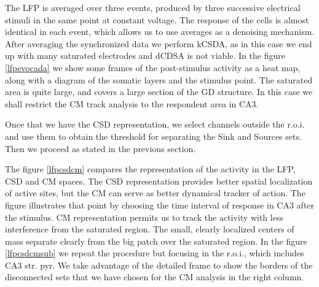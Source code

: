 \documentclass[12pt]{article}
\begin{document}



The LFP is averaged over three events, produced by three successive
electrical stimuli in the same point at constant voltage. The
response of the cells is almost identical in each event, which
allows us to use averages as a denoising mechanism. After averaging
the synchronized data we perform kCSDA, as in this case we end up
with many saturated electrodes and dCDSA is not viable.
In the figure \ref{lfpevocada} we show some frames of the post-stimulus
activity as a heat map, along
with a diagram of the somatic layers and the
stimulus point. The saturated area is quite large, and covers
a large section of the GD structure. In this case we shall
restrict the CM track analysis to the respondent area in CA3.

Once that we have the CSD representation, we select channels outside
the r.o.i. and use them to obtain the threshold for separating
the Sink and Sources sets. Then we proceed as stated in the previous section.

The figure \ref{lfpcsdcm}  compares the representation of the activity in
the LFP, CSD and CM spaces. The CSD
representation provides better spatial localization of active sites, but the
CM can serve as better dynamical tracker of action. The figure illustrates
that point by choosing the time interval of response in CA3 after the stimulus.
CM representation permits us to track the activity with less
interference from the saturated region. The small, clearly localized centers of
mass separate clearly from the big patch over the saturated region.
In the figure \ref{lfpcsdcmsub} we repeat the procedure but focusing in
the r.o.i., which includes CA3 str. pyr. We take advantage of the
detailed frame to show the borders of the disconnected sets that
we have chosen for the CM analysis in the right column.
\end{document}
